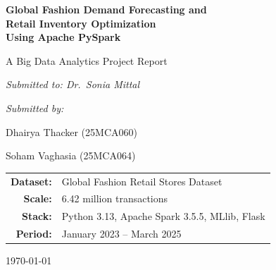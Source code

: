 \documentclass[11pt,a4paper]{article}
\begin{document}
\begin{titlepage}
\centering
\vspace*{2cm}

{\LARGE\bfseries Global Fashion Demand Forecasting and\\[0.3em]
Retail Inventory Optimization\\[0.5em]
Using Apache PySpark\par}

\vspace{1.2cm}
{\large A Big Data Analytics Project Report\par}

\vspace{1.5cm}
{\large\itshape Submitted to: Dr.\ Sonia Mittal\par}
\vspace{1cm}
{\large\itshape Submitted by:\par}
\vspace{0.4cm}
{\large Dhairya Thacker \quad (25MCA060)\par}
\vspace{0.2cm}
{\large Soham Vaghasia \quad (25MCA064)\par}

\vspace{1.5cm}
\begin{tabular}{rl}
\textbf{Dataset:} & Global Fashion Retail Stores Dataset \\
\textbf{Scale:} & 6.42 million transactions \\
\textbf{Stack:} & Python 3.13, Apache Spark 3.5.5, MLlib, Flask \\
\textbf{Period:} & January 2023 -- March 2025 \\
\end{tabular}

\vfill
{\large \today\par}
\end{titlepage}
\end{document}
